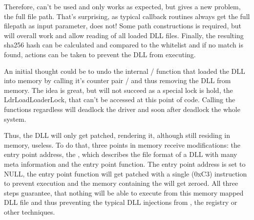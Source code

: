 Therefore,  can't be used and only  works as expected, but gives a new problem, the full file path. That's surprising, as typical callback routines always get the full filepath as input parameter,  does not! Some path constructions is required, but will overall work and allow reading of all loaded DLL files. Finally, the resulting sha256 hash can be calculated and compared to the whitelist and if no match is found, actions can be taken to prevent the DLL from executing. 

An initial thought could be to undo the internal  /  function that loaded the DLL into memory by calling it's counter pair  /  and thus removing the DLL from memory. The idea is great, but will not succeed as a special lock is hold, the LdrLoadLoaderLock, that can't be accessed at this point of code. Calling the functions regardless will deadlock the driver and soon after deadlock the whole system.

Thus, the DLL will only get patched, rendering it, although still residing in memory, useless. To do that, three points in memory receive modifications: the entry point address, the , which describes the file format of a DLL with many meta information and the entry point function. The entry point address is set to NULL, the entry point function will get patched with a single  (0xC3) instruction to prevent execution and the memory containing the  will get zeroed. All three steps guarantee, that nothing will be able to execute from this memory mapped DLL file and thus preventing the typical DLL injections from , the registry or other techniques.